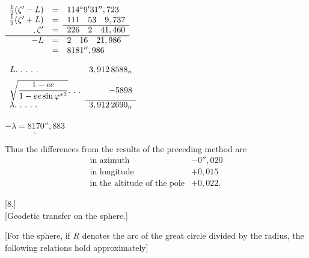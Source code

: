 \begin{minipage}[t]{.33\linewidth}\vspace{0pt}\centering
\(\begin{array}{rcl}
\tfrac12(\zeta'-L)&=&114^\circ9'31'',723\\
\tfrac12(\zeta'+L)&=&111\quad53\quad9,737\\\cline{3-3}
\mathord{\raisebox{-.2ex}{.}}\,\zeta'&=&226\quad2\quad41,460\\\cline{1-3}\noalign{\vskip .45pt}\cline{1-3}
-L&=&2\quad16\quad21,986\\
&=&8181'',986
\end{array}\)
\par\smallskip
\(\begin{array}{lr}
L\ldotp\,\ldotp\,\ldotp\,\ldotp\,\ldotp&3,912\,8588_n\\[1.3ex]
\displaystyle\sqrt{\frac{1-ee}{1-ee\sin\varphi^{*2}}}\ldotp\,\ldotp\,\ldotp&-5898\\\cline{2-2}
\lambda\ldotp\,\ldotp\,\ldotp\,\ldotp\,\ldotp&3,912\,2690_n
\end{array}\)
\par\smallskip
\(\underline{\underline{-\lambda=8170'',883}}\)
\end{minipage}
\par\medskip
Thus the differences from the results of the preceding method are
\[
\begin{array}{lr}
\text{in azimuth}&-0'',020\\
\text{in longitude}&+0,015\\
\text{in the altitude of the pole}&+0,022.
\end{array}
\]
\endgroup
\begin{center}[8.]\\[.5ex][Geodetic transfer on the sphere.]\end{center}
[For the sphere, if \(R\) denotes the arc of the great circle divided by the
radius, the following relations hold approximately]

